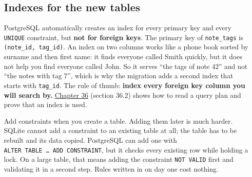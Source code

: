 \begin{codebox}[short]

\begin{Shaded}
\begin{Highlighting}[]
\OperatorTok{=}\NormalTok{(DATABASE\_URL[}\NormalTok{(}\NormalTok{) :])}
\OperatorTok{=}
\NormalTok{)}
\end{Highlighting}
\end{Shaded}

\end{codebox}

\subsection*{Indexes for the new tables}\label{33-logic-execution:indexes-for-the-new-tables}

PostgreSQL automatically creates an index for every primary key and every \texttt{UNIQUE} constraint, but \textbf{not for foreign keys}. The primary key of \texttt{note\_tags} is \texttt{(note\_id,\ tag\_id)}. An index on two columns works like a phone book sorted by surname and then first name: it finds everyone called Smith quickly, but it does not help you find everyone called John. So it serves ``the tags of note 42'' and not ``the notes with tag 7'', which is why the migration adds a second index that starts with \texttt{tag\_id}. The rule of thumb: \textbf{index every foreign key column you will search by.} \hyperref[ch:36-scaling-load]{Chapter 36} (section 36.2) shows how to read a query plan and prove that an index is used.

Add constraints when you create a table. Adding them later is much harder. SQLite cannot add a constraint to an existing table at all; the table has to be rebuilt and its data copied. PostgreSQL can add one with \texttt{ALTER\ TABLE\ …\ ADD\ CONSTRAINT}, but it checks every existing row while holding a lock. On a large table, that means adding the constraint \texttt{NOT\ VALID} first and validating it in a second step. Rules written in on day one cost nothing.

